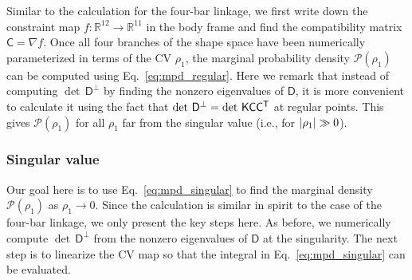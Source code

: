 Similar to the calculation for the four-bar linkage, we first write down the constraint map $f: \mathbb{R}^{12} \to \mathbb{R}^{11}$ in the body frame and find the compatibility matrix $\mathsf{C} = \nabla f$.
Once all four branches of the shape space have been numerically parameterized in terms of the CV $\rho_{1}$, the marginal probability density $\mathscr{P}(\rho_{1})$ can be computed using Eq.~\eqref{eq:mpd_regular}.
Here we remark that instead of computing $\det\,\mathsf{D}^{\perp}$ by finding the nonzero eigenvalues of $\mathsf{D}$, it is more convenient to calculate it using the fact that $\det\,\mathsf{D}^{\perp} = \det\,\mathsf{K}\mathsf{C}\mathsf{C}^\mathsf{T}$ at regular points.
This gives $\mathscr{P}(\rho_{1})$ for all $\rho_{1}$ far from the singular value (i.e., for $\lvert\rho_{1}\rvert \gg 0$).

\subsubsection{Singular value}

Our goal here is to use Eq.~\eqref{eq:mpd_singular} to find the marginal density $\mathscr{P}(\rho_{1})$ as $\rho_{1} \to 0$.
Since the calculation is similar in spirit to the case of the four-bar linkage, we only present the key steps here.
As before, we numerically compute $\det\,\mathsf{D}^{\perp}$ from the nonzero eigenvalues of $\mathsf{D}$ at the singularity.
The next step is to linearize the CV map so that the integral in Eq.~\eqref{eq:mpd_singular} can be evaluated.

